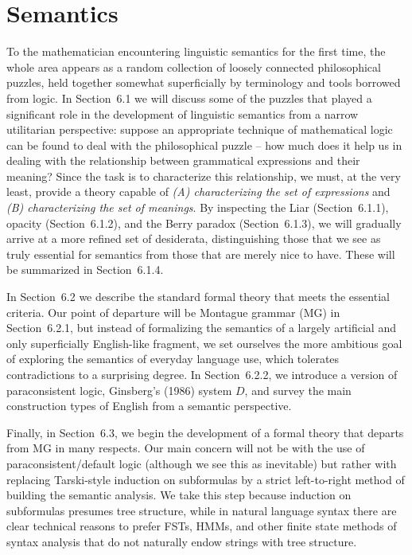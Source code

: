 \chapter{Semantics}

To the mathematician encountering linguistic semantics for the first time, the
whole area appears as a random collection of loosely connected philosophical
puzzles, held together somewhat superficially by terminology and tools
borrowed from logic.  In Section~6.1 we will discuss some of the puzzles that
played a significant role in the development of linguistic semantics from a
narrow utilitarian perspective: suppose an appropriate technique of
mathematical logic can be found to deal with the philosophical puzzle -- how
much does it help us in dealing with the relationship between grammatical
expressions and their meaning? Since the task is to characterize this
relationship, we must, at the very least, provide a theory capable of {\sl (A)
  characterizing the set of expressions} and {\sl (B) characterizing the set
  of meanings}. By inspecting the Liar (Section~6.1.1), opacity
(Section~6.1.2), and the Berry paradox (Section~6.1.3), we will gradually
arrive at a more refined set of desiderata, distinguishing those that we see
as truly essential for semantics from those that are merely nice to have.
These will be summarized in Section~6.1.4.

In Section~6.2 we describe the standard formal theory that meets the essential
criteria. Our point of departure will be Montague grammar (MG) in
Section~6.2.1, but instead of formalizing the semantics of a largely
artificial and only superficially English-like fragment, we set ourselves the
more ambitious goal of exploring the semantics of everyday language use, which
tolerates contradictions to a surprising degree. In Section~6.2.2, we introduce
a version of paraconsistent logic, Ginsberg's (1986) system $D$, and survey
the main construction types of English from a semantic perspective.

Finally, in Section~6.3, we begin the development of a formal theory that
departs from MG in many respects. Our main concern will not be with the use of
paraconsistent/default logic (although we see this as inevitable) but rather
with replacing Tarski-style induction on subformulas by a strict left-to-right
method of building the semantic analysis. We take this step because induction
on subformulas presumes tree structure, while in natural language syntax there
are clear technical reasons to prefer FSTs, HMMs, and other finite state
methods of syntax analysis that do not naturally endow strings with tree
structure.

